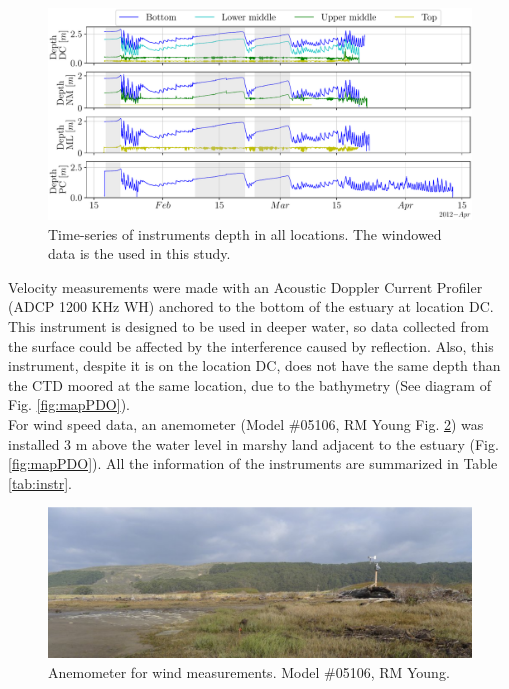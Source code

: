 \documentclass[tesis.tex]{subfiles}
\begin{document}
\begin{figure}[h!]
    \centering
    \includegraphics[width=\textwidth]{Imagenes/depth.pdf}
    \caption{Time-series of instruments depth in all locations. The windowed data is the used in this study.}
    \label{fig:depth}
\end{figure}

Velocity measurements were made with an Acoustic Doppler Current Profiler (ADCP 1200 KHz WH) anchored to the bottom of the estuary at location DC. This instrument is designed to be used in deeper water, so data collected from the surface could be affected by the interference caused by reflection. Also, this instrument, despite it is on the location DC, does not have the same depth than the CTD moored at the same location, due to the bathymetry (See diagram of Fig. \ref{fig:mapPDO}).\\

For wind speed data, an anemometer (Model $\#$05106, RM Young Fig. \ref{fig:anemometer}) was installed 3 m above the water level in marshy land adjacent to the estuary (Fig. \ref{fig:mapPDO}). All the information of the instruments are summarized in Table \ref{tab:instr}.\\

\begin{figure}[h!]
    \centering
    \includegraphics[width=\textwidth]{Imagenes/anemometer.png}
    \caption{Anemometer for wind measurements. Model $\#$05106, RM Young. \citep{Williams2014}}
    \label{fig:anemometer}
\end{figure}
\end{document}
